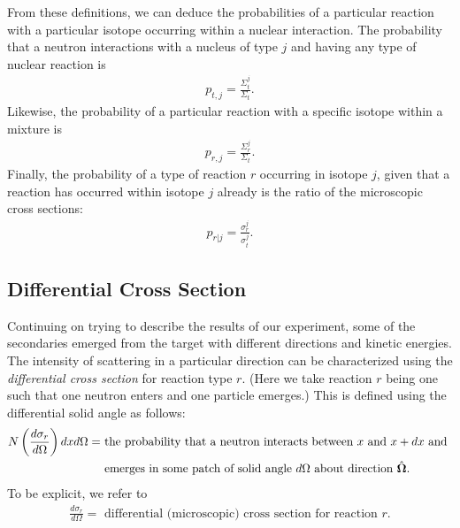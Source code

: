 From these definitions, we can deduce the probabilities of a particular reaction with a particular isotope occurring within a nuclear interaction. The probability that a neutron interactions with a nucleus of type $j$ and having any type of nuclear reaction is
\begin{align}
  p_{t,j} = \frac{ \Sigma_t^j }{ \Sigma_t } .
\end{align}
Likewise, the probability of a particular reaction with a specific isotope within a mixture is
\begin{align}
  p_{r,j} = \frac{ \Sigma_r^j }{ \Sigma_t } .
\end{align}
Finally, the probability of a type of reaction $r$ occurring in isotope $j$, given that a reaction has occurred within isotope $j$ already is the ratio of the microscopic cross sections:
\begin{align}
  p_{r|j} = \frac{\sigma_r^j}{\sigma_t^j}.
\end{align}

\subsection{Differential Cross Section}

Continuing on trying to describe the results of our experiment, some of the secondaries emerged from the target with different directions and kinetic energies. The intensity of scattering in a particular direction can be characterized using the \emph{differential cross section} for reaction type $r$. (Here we take reaction $r$ being one such that one neutron enters and one particle emerges.) This is defined using the differential solid angle as follows:
\begin{align}
  N \left( \frac{d\sigma_r}{d\Omega} \right) dx d\Omega
  = &\text{ the probability that a neutron interacts between $x$ and $x + dx$ and } \nonumber \\
    &\text{ emerges in some patch of solid angle $d\Omega$ about direction $\hat{\mathbf{\Omega}}$. } \nonumber
\end{align}
To be explicit, we refer to
\begin{align}
  \frac{d\sigma_r}{d\Omega} = \text{ differential (microscopic) cross section for reaction $r$.} \nonumber
\end{align}

